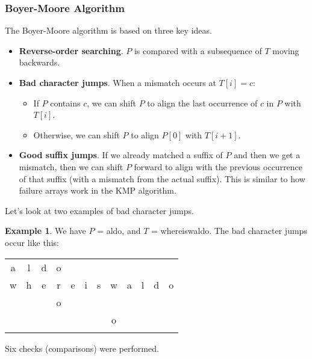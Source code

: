 \documentclass[]{article}
\theoremstyle{definition}
\newtheorem{ex}{Example}[section]
\begin{document}
			\subsubsection{Boyer-Moore Algorithm}
				The Boyer-Moore algorithm is based on three key ideas.
				\begin{itemize}
					\item \textbf{Reverse-order searching}. $P$ is compared with a subsequence of $T$ moving backwards.
					\item \textbf{Bad character jumps}. When a mismatch occurs at $T[i] = c$:
						\begin{itemize}
							\item If $P$ contains $c$, we can shift $P$ to align the last occurrence of $c$ in $P$ with $T[i]$.
							\item Otherwise, we can shift $P$ to align $P[0]$ with $T[i + 1]$.
						\end{itemize}
					\item \textbf{Good suffix jumps}. If we already matched a suffix of $P$ and then we get a mismatch, then we can shift $P$ forward to align with the previous occurrence of that suffix (with a mismatch from the actual suffix). This is similar to how failure arrays work in the KMP algorithm.
				\end{itemize}

				Let's look at two examples of bad character jumps.

				\begin{ex}
					We have $P$ = aldo, and $T$ = whereiswaldo. The bad character jumps occur like this:
					\begin{center}
						\begin{tabular}{|c|c|c|c|c|c|c|c|c|c|c|c|}
							a & l & d & o & & & & & & & & \\
							w & h & e & r & e & i & s & w & a & l & d & o \\ \hline \hline
							& & & o & & & & & & & & \\
							& & & & & & & o & & & & \\
							& & & & & & & & \color{green}{a} & \color{green}{l} & \color{green}{d} & \color{green}{o} \\ \hline
						\end{tabular}
					\end{center}

					Six checks (comparisons) were performed.
				\end{ex}
\end{document}
